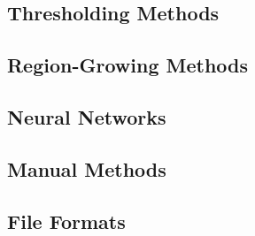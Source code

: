 \subsection{Thresholding Methods}
\label{Thresholding Methods}

\subsection{Region-Growing Methods}
\label{Region-Growing Methods}

\subsection{Neural Networks}
\label{Neural Networks}

\subsection{Manual Methods}
\label{Manual Methods}

\subsection{File Formats}
\label{Data Format-SEG}
